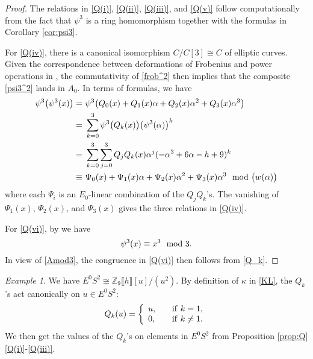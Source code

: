 \documentclass{gtpart}
\theoremstyle{definition}
\theoremstyle{remark}
\newtheorem{ex}[thm]{Example}
\newcommand{\mb}[1]{\mathbb{#1}}
\newcommand{\BZ}{{\mb Z}}
\newcommand{\md}{~~{\rm mod}~}
\newcommand{\A}{\alpha}
\newcommand{\K}{\kappa}
\newcommand{\p}{\psi^3}
\newcommand{\q}[1]{Proposition \ref{prop:Q}\thinspace \eqref{Q(#1)}}
\begin{document}
\begin{proof}
 The relations in \eqref{Q(i)}, \eqref{Q(ii)}, \eqref{Q(iii)}, and \eqref{Q(v)} follow computationally from 
 the fact that $\p$ is a ring homomorphism together with the formulas in Corollary \ref{cor:psi3}.  

 For \eqref{Q(iv)}, there is a canonical isomorphism $C/C[3] \cong C$ of elliptic curves.  
 Given the correspondence between deformations of Frobenius and power operations in \cite[Theorem B]{cong}, 
 the commutativity of \eqref{frob^2} then implies that the composite \eqref{psi3^2} lands in $A_0$.  In terms of formulas, we have 
 \begin{equation*}
 \begin{split}
  \p \big( \p(x) \big) = & ~ \p \big( Q_0(x) + Q_1(x) \A + Q_2(x) \A^2 + Q_3(x) \A^3 \big) \\
                       = & ~ \sum_{k = 0}^3 \p \big( Q_k(x) \big) \big( \p(\A) \big)^k \\
                       = & ~ \sum_{k = 0}^3 \sum_{j = 0}^3 Q_jQ_k(x) \A^j (-\A^3 + 6 \A - h + 9)^k \\
                  \equiv & ~ \Psi_0(x) + \Psi_1(x) \A + \Psi_2(x) \A^2 + \Psi_3(x) \A^3 \md \big( w(\A) \big) 
 \end{split}
 \end{equation*}
 where each $\Psi_i$ is an $E_0$-linear combination of the $Q_jQ_k$'s.  
 The vanishing of $\Psi_1(x)$, $\Psi_2(x)$, and $\Psi_3(x)$ gives the three relations in \eqref{Q(iv)}.  

 For \eqref{Q(vi)}, by \cite[Propositions 3.25 and 10.5]{cong} we have 
 \[
  \p(x) \equiv x^3 \md 3.  
 \]
 In view of \eqref{Amod3}, the congruence in \eqref{Q(vi)} then follows from \eqref{Q_k}.  
\end{proof}

\begin{ex}
\label{ex}
 We have $E^0 S^2 \cong \BZ_9 \llbracket h \rrbracket [u] / (u^2)$.  
 By definition of $\K$ in \eqref{KL}, the $Q_k$'s act canonically on $u \in E^0 S^2$: 
 \[
  Q_k(u) = \left\{
  \begin{array}{ll}
    u,  & \quad {\rm if}~k = 1, \\
    0,  & \quad {\rm if}~k \neq 1.  \\
  \end{array}
  \right.
 \]
 We then get the values of the $Q_k$'s on elements in $E^0 S^2$ from \q{i}-\eqref{Q(iii)}.  
\end{ex}
\end{document}
